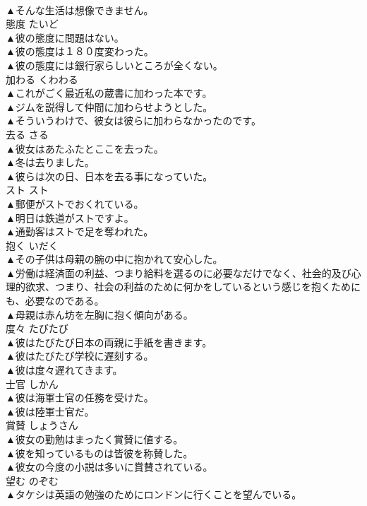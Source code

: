 \documentclass[8pt]{extreport}
\begin{document}
\begin{CJK}{UTF8}{min}
\\	▲そんな生活は想像できません。 
\\	態度	たいど	
\\	▲彼の態度に問題はない。 
\\	▲彼の態度は１８０度変わった。 
\\	▲彼の態度には銀行家らしいところが全くない。 
\\	加わる	くわわる	
\\	▲これがごく最近私の蔵書に加わった本です。 
\\	▲ジムを説得して仲間に加わらせようとした。 
\\	▲そういうわけで、彼女は彼らに加わらなかったのです。 
\\	去る	さる	
\\	▲彼女はあたふたとここを去った。 
\\	▲冬は去りました。 
\\	▲彼らは次の日、日本を去る事になっていた。 
\\	スト	スト	
\\	▲郵便がストでおくれている。 
\\	▲明日は鉄道がストですよ。 
\\	▲通勤客はストで足を奪われた。 
\\	抱く	いだく	
\\	▲その子供は母親の腕の中に抱かれて安心した。 
\\	▲労働は経済面の利益、つまり給料を選るのに必要なだけでなく、社会的及び心理的欲求、つまり、社会の利益のために何かをしているという感じを抱くためにも、必要なのである。 
\\	▲母親は赤ん坊を左胸に抱く傾向がある。 
\\	度々	たびたび	
\\	▲彼はたびたび日本の両親に手紙を書きます。 
\\	▲彼はたびたび学校に遅刻する。 
\\	▲彼は度々遅れてきます。 
\\	士官	しかん	
\\	▲彼は海軍士官の任務を受けた。 
\\	▲彼は陸軍士官だ。 
\\	賞賛	しょうさん	
\\	▲彼女の勤勉はまったく賞賛に値する。 
\\	▲彼を知っているものは皆彼を称賛した。 
\\	▲彼女の今度の小説は多いに賞賛されている。 
\\	望む	のぞむ	
\\	▲タケシは英語の勉強のためにロンドンに行くことを望んでいる。 

\end{CJK}
\end{document}
